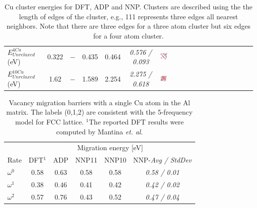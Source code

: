 \documentclass{article}
\begin{document}
\begin{table}[H]
\begin{tabular}{l|cccccV}
$E^{4Cu}_{Unrelaxed}$(eV)&0.322& $-$ &0.435&0.464&\emph{0.576 / 0.093}&  \includegraphics[width=0.07\textwidth]{figures/SoluteCluster_111122.png}\\%
$E^{10Cu}_{Unrelaxed}$(eV)&1.62& $-$ &1.589& 2.254 &\emph{2.275 / 0.618}&  \includegraphics[width=0.07\textwidth]{figures/SoluteCluster_10atoms.png}\\%
\hline%
\end{tabular}%
\caption{Cu cluster energies for DFT, ADP and NNP. Clusters are described using the the length of edges of the cluster, e.g., 111 represents three edges all nearest neighbors. Note that there are three edges for a three atom cluster but six edges for a four atom cluster.
}
\label{table:solute_cluster}
\end{table}


\begin{table}[H]
	\centering
	\begin{tabular}{l|ccccc}
		\toprule
		& \multicolumn{5}{c}{Migration energy [eV]}                   \\
		\cmidrule(r){2-6}
		Rate         & DFT$^1$    & ADP  & NNP11 & NNP10  & NNP-\emph{Avg / StdDev}  \\
		\midrule
		$\omega^{0}$ & 0.58 & 0.63 & 0.58 & 0.58 & \emph{0.58 / 0.01}\\
		$\omega^{1}$ & 0.38 & 0.46 & 0.41 & 0.42 & \emph{0.42 / 0.02}\\
		$\omega^{2}$ & 0.57 & 0.76 & 0.43 & 0.52 & \emph{0.47 / 0.04}\\
		\bottomrule
	\end{tabular}
	\caption{Vacancy migration barriers with a single Cu atom in the Al matrix. The labels (0,1,2) are consistent with the 5-frequency model for FCC lattice. $^1$The reported DFT results were computed by Mantina \textit{et. al}\cite{Mantina2009FirstCoefficients}.}
	\label{tab:vacmig}
\end{table}
\end{document}
